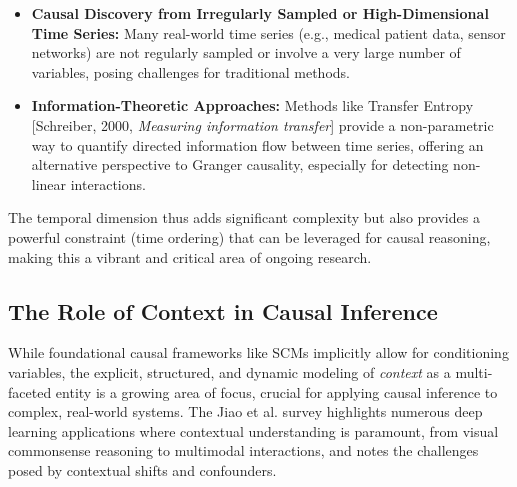 {\begin{itemize}
    \item \textbf{Causal Discovery from Irregularly Sampled or High-Dimensional Time Series:} Many real-world time series (e.g., medical patient data, sensor networks) are not regularly sampled or involve a very large number of variables, posing challenges for traditional methods.
    \item \textbf{Information-Theoretic Approaches:} Methods like Transfer Entropy [Schreiber, 2000, \textit{Measuring information transfer}] provide a non-parametric way to quantify directed information flow between time series, offering an alternative perspective to Granger causality, especially for detecting non-linear interactions.
\end{itemize}

The temporal dimension thus adds significant complexity but also provides a powerful constraint (time ordering) that can be leveraged for causal reasoning, making this a vibrant and critical area of ongoing research.


\subsection{The Role of Context in Causal Inference}
\label{subsec:context_temporality_causality}

While foundational causal frameworks like SCMs implicitly allow for conditioning variables, the explicit, structured, and dynamic modeling of \textit{context} as a multi-faceted entity is a growing area of focus, crucial for applying causal inference to complex, real-world systems. The Jiao et al. survey \cite{jiao2024causal} highlights numerous deep learning applications where contextual understanding is paramount, from visual commonsense reasoning to multimodal interactions, and notes the challenges posed by contextual shifts and confounders.

}
